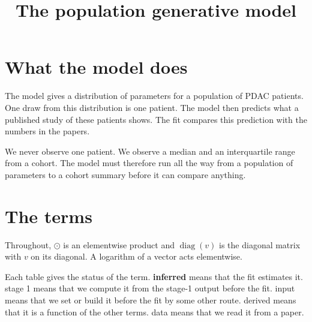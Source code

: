 \documentclass[11pt]{article}
\title{\bfseries The population generative model}
\author{}
\date{}
\DeclareMathOperator{\diag}{diag}
\newcommand{\INF}{\textcolor{accent}{\textbf{inferred}}}
\newcommand{\FIX}{\textcolor{softgray}{input}}
\newcommand{\DER}{\textcolor{softgray}{derived}}
\newcommand{\OBS}{\textcolor{softgray}{data}}
\newcommand{\STG}{\textcolor{softgray}{stage 1}}
\begin{document}
\maketitle
\vspace{-2.5em}

\section{What the model does}

The model gives a distribution of parameters for a population of PDAC patients.
One draw from this distribution is one patient. The model then predicts what a
published study of these patients shows. The fit compares this prediction with
the numbers in the papers.

We never observe one patient. We observe a median and an interquartile range
from a cohort. The model must therefore run all the way from a population of
parameters to a cohort summary before it can compare anything.

\section{The terms}

Throughout, $\odot$ is an elementwise product and $\diag(v)$ is the diagonal
matrix with $v$ on its diagonal. A logarithm of a vector acts elementwise.

Each table gives the status of the term. \INF{} means that the fit estimates
it. \STG{} means that we compute it from the stage-1 output before the fit.
\FIX{} means that we set or build it before the fit by some other route. \DER{}
means that it is a function of the other terms. \OBS{} means that we read it
from a paper.
\end{document}
